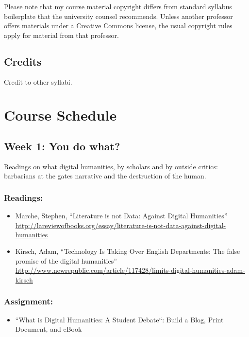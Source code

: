\documentclass[]{article}
\begin{document}
Please note that my course material copyright differs from standard
syllabus boilerplate that the university counsel recommends. Unless
another professor offers materials under a Creative Commons license, the
usual copyright rules apply for material from that professor.

\subsection{Credits}\label{credits}

Credit to other syllabi.

\section{Course Schedule}\label{course-schedule}

\subsection{Week 1: You do what?}\label{week-1-you-do-what}

Readings on what digital humanities, by scholars and by outside critics:
barbarians at the gates narrative and the destruction of the human.

\subsubsection{Readings:}\label{readings}

\begin{itemize}
\itemsep1pt\parskip0pt
\item
  Marche, Stephen, ``Literature is not Data: Against Digital
  Humanities''
  \url{http://lareviewofbooks.org/essay/literature-is-not-data-against-digital-humanities}
\item
  Kirsch, Adam, ``Technology Is Taking Over English Departments: The
  false promise of the digital humanities''
  \url{http://www.newrepublic.com/article/117428/limits-digital-humanities-adam-kirsch}
\end{itemize}

\subsubsection{Assignment:}\label{assignment}

\begin{itemize}
\itemsep1pt\parskip0pt
\item
  ``What is Digital Humanities: A Student Debate``: Build a Blog, Print
  Document, and eBook
\end{itemize}
\end{document}

